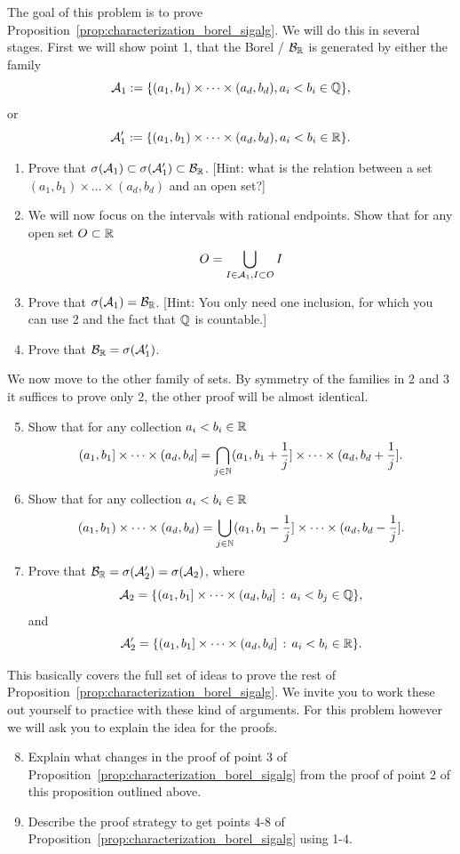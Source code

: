 \begin{problem}\label{prb:borel_sigalg_1d}
The goal of this problem is to prove Proposition~\ref{prop:characterization_borel_sigalg}. We will do this in several stages. First we will show point 1, that the Borel \sigalg/ $\mathcal B_{\mathbb R}$ is generated by either the family 
\[
	\mathcal A_1 := \{(a_1, b_1) \times \dots \times (a_d, b_d), a_i < b_i \in \mathbb Q\},
\]
or 
\[
	\mathcal A_1^\prime := \{(a_1, b_1) \times \dots \times (a_d, b_d), a_i < b_i\in \mathbb R\}.
\]
\begin{enumerate}[label=(\alph*)]
\item Prove that $\sigma(\mathcal A_1) \subset \sigma(\mathcal A_1^\prime) \subset \mathcal B_{\mathbb R}$. [Hint: what is the relation between a set $(a_1,b_1) \times \dots \times (a_d, b_d)$ and an open set?]
\item We will now focus on the intervals with rational endpoints. Show that for any open set $O \subset \mathbb R$
\[
	O = \bigcup_{I \in \mathcal A_1, I \subset O} I
\]
\item Prove that $\sigma(\mathcal A_1) = \mathcal B_{\mathbb R}$. [Hint: You only need one inclusion, for which you can use 2 and the fact that $\mathbb Q$ is countable.]
\item Prove that $\mathcal B_{\mathbb R} = \sigma(\mathcal A_1^\prime)$.
\end{enumerate}

We now move to the other family of sets. By symmetry of the families in 2 and 3 it suffices to prove only 2, the other proof will be almost identical.
\begin{enumerate}[label=(\alph*)]
\setcounter{enumi}{4}
\item Show that for any collection $a_i < b_i \in \mathbb R$
\[
	(a_1,b_1] \times \dots \times (a_d, b_d] = \bigcap_{j \in \mathbb N} (a_1, b_1+\frac{1}{j}] \times \dots \times (a_d, b_d+\frac{1}{j}].
\]
\item Show that for any collection $a_i < b_i \in \mathbb R$
\[
	(a_1,b_1) \times \dots \times (a_d, b_d) = \bigcup_{j \in \mathbb N} (a_1, b_1-\frac{1}{j}] \times \dots \times (a_d, b_d-\frac{1}{j}].
\]
\item Prove that $\mathcal B_{\mathbb R} = \sigma(\mathcal A_2^\prime) = \sigma(\mathcal A_2)$, where 
\[
	\mathcal A_2 = \{(a_1,b_1] \times \dots \times (a_d, b_d] \, : \, a_i < b_j \in \mathbb Q\},
\] 
and 
\[
	\mathcal A_2^\prime = \{(a_1,b_1] \times \dots \times (a_d, b_d] \, : \, a_i < b_i \in \mathbb R\}.
\]
\end{enumerate}

This basically covers the full set of ideas to prove the rest of Proposition~\ref{prop:characterization_borel_sigalg}. We invite you to work these out yourself to practice with these kind of arguments. For this problem however we will ask you to explain the idea for the proofs.
\begin{enumerate}[label=(\alph*)]
\setcounter{enumi}{7}
\item Explain what changes in the proof of point 3 of Proposition~\ref{prop:characterization_borel_sigalg} from the proof of point 2 of this proposition outlined above.
\item Describe the proof strategy to get points 4-8 of Proposition~\ref{prop:characterization_borel_sigalg} using 1-4.
\end{enumerate}
\end{problem}


